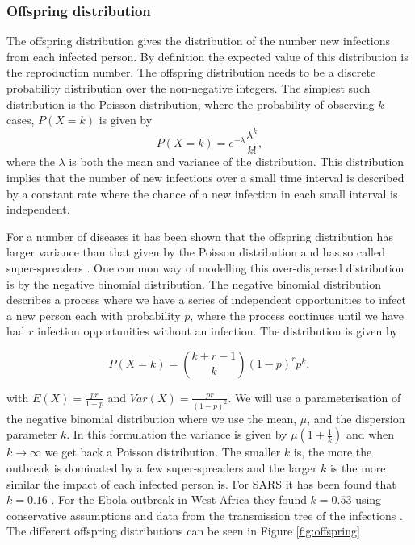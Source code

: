 \documentclass[12pt]{article}
\begin{document}
\subsubsection{Offspring distribution}
The offspring distribution gives the distribution of the number new infections from each infected person. By definition the expected value of this distribution is the reproduction number. The offspring distribution needs to be a discrete probability distribution over the non-negative integers. The simplest such distribution is the Poisson distribution, where the probability of observing $k$ cases, $P(X=k)$ is given by
\[P(X=k) = e^{-\lambda}\frac{\lambda^k}{k!}, \]
where the $\lambda$ is both the mean and variance of the distribution. This distribution implies that the number of new infections over a small time interval is described by a constant rate where the chance of a new infection in each small interval is independent.

For a number of diseases it has been shown that the offspring distribution has larger variance than that given by the Poisson distribution and has so called super-spreaders \cite{lloyd-smithSuperspreadingEffectIndividual2005}. One common way of modelling this over-dispersed distribution is by the negative binomial distribution. The negative binomial distribution describes a process where we have a series of independent opportunities to infect a new person each with probability $p$, where the process continues until we have had $r$ infection opportunities without an infection. The distribution is given by

\[P(X=k) = {k + r - 1 \choose k} (1-p)^rp^k, \]

with $E(X)=\frac{pr}{1-p}$ and $Var(X) = \frac{pr}{(1-p)^2}$. We will use a parameterisation of the negative binomial distribution where we use the mean, $\mu$, and the dispersion parameter $k$. In this formulation the variance is given by $\mu(1 + \frac{1}{k})$ and when $k \rightarrow \infty$ we get back a Poisson distribution. The smaller $k$ is, the more the outbreak is dominated by a few super-spreaders and the larger $k$ is the more similar the impact of each infected person is. For SARS it has been found that $k=0.16$ \cite{lloyd-smithSuperspreadingEffectIndividual2005}. For the Ebola outbreak in West Africa they found $k=0.53$ using conservative assumptions and data from the transmission tree of the infections \cite{internationalebolaresponseteamExposurePatternsDriving2016}. The different offspring distributions can be seen in Figure \ref{fig:offspring}
\end{document}
